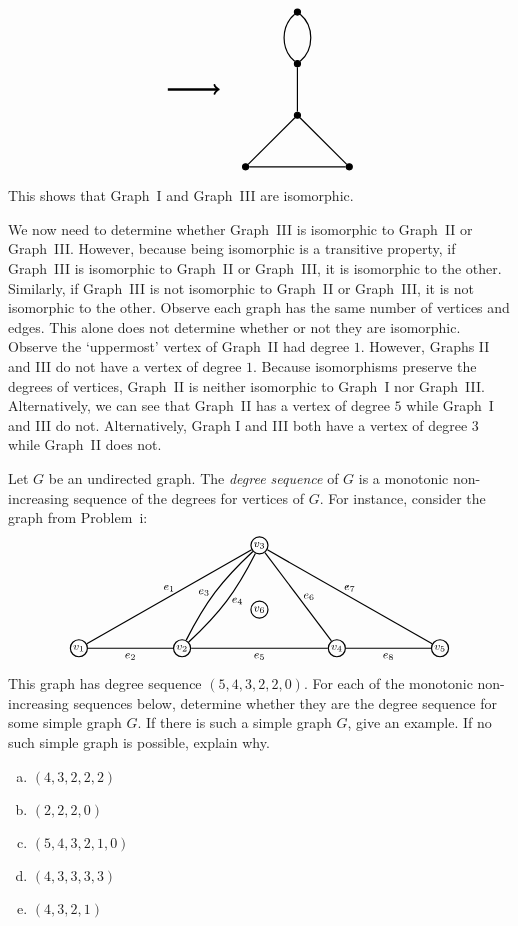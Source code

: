 \documentclass[11pt,letterpaper]{article}
\begin{document}
\[\begin{tikzpicture}[scale=1.3]
	\draw[line width=0.06cm,->] (1.5,0.5) -- (2.5,0.5);
	
	\tikzset{shift= {(4,-1)}}
	
	\node[draw,inner sep=0.5pt,minimum size=1pt,line width=0.03cm,circle,fill=black] at (-1, 0)   (a) {.};
	\node[draw,inner sep=0.5pt,minimum size=1pt,line width=0.03cm,circle,fill=black] at (1, 0)   (b) {.};
	\node[draw,inner sep=0.5pt,minimum size=1pt,line width=0.03cm,circle,fill=black] at (0, 1)   (c) {.};
	\node[draw,inner sep=0.5pt,minimum size=1pt,line width=0.03cm,circle,fill=black] at (0, 2)   (d) {.};
	\node[draw,inner sep=0.5pt,minimum size=1pt,line width=0.03cm,circle,fill=black] at (0, 3)   (e) {.};
	
	\path[line width=0.03cm] (a) edge node[below] {} (b);
	\path[line width=0.03cm] (a) edge node[below] {} (c);
	\path[line width=0.03cm] (b) edge node[below] {} (c);
	\path[line width=0.03cm] (c) edge node[below] {} (d);
	\path[line width=0.03cm,bend left=50] (d) edge node[below] {} (e);
	\path[line width=0.03cm,bend right=50] (d) edge node[below] {} (e);
	\end{tikzpicture}
	\]
This shows that Graph~I and Graph~III are isomorphic. \pspace

We now need to determine whether Graph~III is isomorphic to Graph~II or Graph~III. However, because being isomorphic is a transitive property, if Graph~III is isomorphic to Graph~II or Graph~III, it is isomorphic to the other. Similarly, if Graph~III is not isomorphic to Graph~II or Graph~III, it is not isomorphic to the other. Observe each graph has the same number of vertices and edges. This alone does not determine whether or not they are isomorphic. Observe the `uppermost' vertex of Graph~II had degree $1$. However, Graphs II and III do not have a vertex of degree $1$. Because isomorphisms preserve the degrees of vertices, Graph~II is neither isomorphic to Graph~I nor Graph~III. Alternatively, we can see that Graph~II has a vertex of degree $5$ while Graph~I and III do not. Alternatively, Graph I and III both have a vertex of degree $3$ while Graph~II does not. 



\newpage



 Let $G$ be an undirected graph. The \textit{degree sequence} of $G$ is a monotonic non-increasing sequence of the degrees for vertices of $G$. For instance, consider the graph from Problem~i: 
	\[
	\graphOne
	\]
This graph has degree sequence $(5, 4, 3, 2, 2, 0)$. For each of the monotonic non-increasing sequences below, determine whether they are the degree sequence for some simple graph $G$. If there is such a simple graph $G$, give an example. If no such simple graph is possible, explain why. 
	\begin{enumerate}[(a)]
	\item $(4, 3, 2, 2, 2)$
	\item $(2, 2, 2, 0)$
	\item $(5, 4, 3, 2, 1, 0)$ 
	\item $(4, 3, 3, 3, 3)$
	\item $(4, 3, 2, 1)$
	\end{enumerate} \pspace
\end{document}
